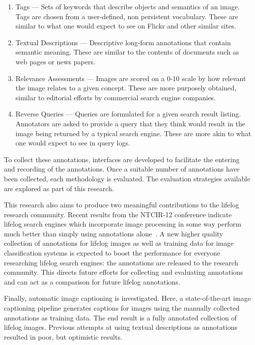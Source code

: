\begin{enumerate}
    \item Tags --- Sets of keywords that describe objects and semantics of an image. Tags are chosen from a user-defined, non persistent vocabulary. These are similar to what one would expect to see on Flickr and other similar sites.
    \item Textual Descriptions --- Descriptive long-form annotations that contain semantic meaning. These are similar to the contents of documents such as web pages or news papers.
    \item Relevance Assessments --- Images are scored on a 0-10 scale by how relevant the image relates to a given concept. These are more purposely obtained, similar to editorial efforts by commercial search engine companies.
    \item Reverse Queries --- Queries are formulated for a given search result listing. Annotators are asked to provide a query that they think would result in the image being returned by a typical search engine. These are more akin to what one would expect to see in query logs.
\end{enumerate}

To collect these annotations, interfaces are developed to facilitate the entering and recording of the annotations. Once a suitable number of annotations have been collected, each methodology is evaluated. The evaluation strategies available are explored as part of this research.

This research also aims to produce two meaningful contributions to the lifelog research community. Recent results from the NTCIR-12 conference indicate lifelog search engines which incorporate image processing in some way perform much better than simply using annotations alone~\cite{safadilig2016ligmrim}. A new higher quality collection of annotations for lifelog images as well as training data for image classification systems is expected to boost the performance for everyone researching lifelog search engines: the annotations are released to the research community. This directs future efforts for collecting and evaluating annotations and can act as a comparison for future lifelog annotations.

Finally, automatic image captioning is investigated. Here, a state-of-the-art image captioning pipeline generates captions for images using the manually collected annotations as training data. The end result is a fully annotated collection of lifelog images. Previous attempts at using textual descriptions as annotations~\cite{scells2016qut} resulted in poor, but optimistic results. 

